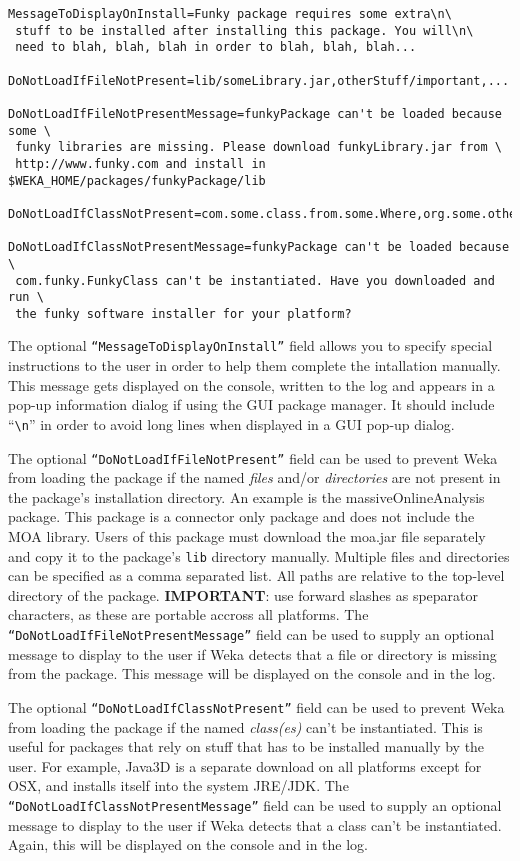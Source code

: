 {\scriptsize
\begin{verbatim}
MessageToDisplayOnInstall=Funky package requires some extra\n\
 stuff to be installed after installing this package. You will\n\
 need to blah, blah, blah in order to blah, blah, blah...

DoNotLoadIfFileNotPresent=lib/someLibrary.jar,otherStuff/important,...

DoNotLoadIfFileNotPresentMessage=funkyPackage can't be loaded because some \
 funky libraries are missing. Please download funkyLibrary.jar from \
 http://www.funky.com and install in $WEKA_HOME/packages/funkyPackage/lib

DoNotLoadIfClassNotPresent=com.some.class.from.some.Where,org.some.other.Class,...

DoNotLoadIfClassNotPresentMessage=funkyPackage can't be loaded because \
 com.funky.FunkyClass can't be instantiated. Have you downloaded and run \
 the funky software installer for your platform?
\end{verbatim}}

The optional \texttt{``MessageToDisplayOnInstall''} field allows you
to specify special instructions to the user in order to help them
complete the intallation manually.  This message gets displayed on the
console, written to the log and appears in a pop-up information dialog
if using the GUI package manager. It should include ``\verb=\n='' in
order to avoid long lines when displayed in a GUI pop-up dialog.

The optional \texttt{``DoNotLoadIfFileNotPresent''} field can be used
to prevent Weka from loading the package if the named \textit{files}
and/or \textit{directories} are not present in the package's
installation directory. An example is the massiveOnlineAnalysis
package. This package is a connector only package and does not include
the MOA library. Users of this package must download the moa.jar file
separately and copy it to the package's \texttt{lib} directory
manually. Multiple files and directories can be specified as a comma
separated list. All paths are relative to the top-level directory of
the package. \textbf{IMPORTANT}: use forward slashes as speparator
characters, as these are portable accross all platforms. The
\texttt{``DoNotLoadIfFileNotPresentMessage''} field can be used to
supply an optional message to display to the user if Weka detects that
a file or directory is missing from the package. This message will be
displayed on the console and in the log.

The optional \texttt{``DoNotLoadIfClassNotPresent''} field can be used
to prevent Weka from loading the package if the named
\textit{class(es)} can't be instantiated. This is useful for packages
that rely on stuff that has to be installed manually by the user. For
example, Java3D is a separate download on all platforms except for
OSX, and installs itself into the system JRE/JDK. The
\texttt{``DoNotLoadIfClassNotPresentMessage''} field can be used to
supply an optional message to display to the user if Weka detects that
a class can't be instantiated. Again, this will be displayed on the
console and in the log.


